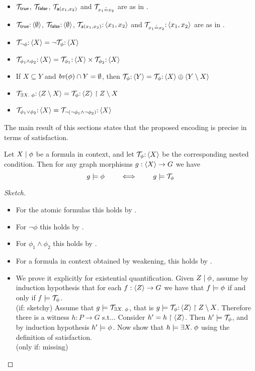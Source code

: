 \begin{itemize}
	\item ${\mathcal{T}}_{\mathsf{true}}$, ${\mathcal{T}}_{\mathsf{false}}$, ${\mathcal{T}}_{\mathsf{a}(x_1,x_2)}$ and ${\mathcal{T}}_{x_1\mathbin{\doteq} x_2}$ are as in . 
	\item ${\mathcal{T}}_{\mathsf{true}} {:}\, \langle \emptyset\rangle$, ${\mathcal{T}}_{\mathsf{false}}{:}\, \langle \emptyset\rangle$, ${\mathcal{T}}_{\mathsf{a}(x_1,x_2)}{:}\, \langle x_1,x_2\rangle$ and ${\mathcal{T}}_{x_1\mathbin{\doteq} x_2}{:}\, \langle x_1,x_2\rangle$ are as in .
	\item  ${\mathcal{T}}_{\neg \phi} {:}\,\langle X\rangle = \neg {\mathcal{T}}_{\phi} {:}\, \langle X\rangle$
	\item  ${\mathcal{T}}_{\phi_1 \wedge \phi_2}{:}\,\langle X\rangle = {\mathcal{T}}_{\phi_1}{:}\,\langle X\rangle \times {\mathcal{T}}_{\phi_2} {:}\,\langle X\rangle$
	\item If $X \subseteq Y$ and $\mathit{bv}(\phi)\cap Y = \emptyset$, then ${\mathcal{T}}_\phi {:}\, \langle Y\rangle =  {\mathcal{T}}_\phi {:}\, \langle X\rangle \oplus \langle Y\setminus X\rangle$
	\item ${\mathcal{T}}_{\exists X.\; \phi}{:}\,\langle Z \setminus X\rangle = {\mathcal{T}}_{\phi}{:}\,\langle Z\rangle \restriction Z\setminus X$
	\item ${\mathcal{T}}_{\phi_1 \vee \phi_2}{:}\,\langle X\rangle = {\mathcal{T}}_{\neg( \neg \phi_1 \wedge \neg \phi_2)}{:}\,\langle X\rangle$
\end{itemize}

The main result of this sections states that the proposed encoding is precise in terms of satisfaction. 
\begin{proposition}
	Let ${X} \mid {\phi}$ be a formula in context, and let ${\mathcal{T}}_\phi {:}\, \langle X\rangle$ be the corresponding nested condition. Then for any graph morphisms $g: \langle X\rangle \rightarrow G$ we have
	$$ g \models \phi \qquad \iff \qquad g \models {\mathcal{T}}_\phi $$
\end{proposition}
\begin{proof}[Sketch]
	\begin{itemize}
	\item For the atomic formulas this holds by .
	\item For $\neg \phi$ this holds by .
	
	\item For $\phi_1 \wedge \phi_2$ this holds by .
	\item For a formula in context obtained by weakening, this holds by .
	\item We prove it explicitly for existential quantification. Given ${Z} \mid {\phi}$, assume by induction hypothesis that for each $f: \langle Z\rangle \rightarrow G$ we have that  $f \models \phi$ if and only if $f \models {\mathcal{T}}_\phi$. \\
	(if: sketchy) Assume that  $g \models {\mathcal{T}}_{\exists X.\; \phi}$, that is $g \models {\mathcal{T}}_{\phi}{:}\,\langle Z\rangle \restriction Z\setminus X$. Therefore there is a witness $h: P \to G$ s.t... Consider $h' = h \restriction \langle Z\rangle$. Then $h' \models {\mathcal{T}}_\phi$, and by induction hypothesis $h' \models \phi$.
	Now show that $h \models \exists X.\; \phi$ using the definition of satisfaction.\\
	(only if: missing)
\end{itemize}


\end{proof}

